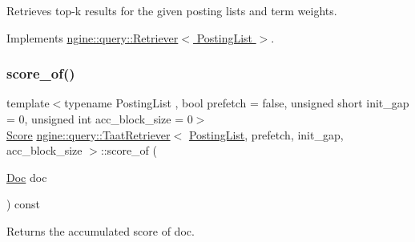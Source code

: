 Retrieves top-\/k results for the given posting lists and term weights. 



Implements \hyperlink{classngine_1_1query_1_1Retriever_ac5549667cbb5927ec4ead8b9ec8aece0}{ngine\+::query\+::\+Retriever$<$ Posting\+List $>$}.

\mbox{\label{classngine_1_1query_1_1TaatRetriever_abebbcb23c11cbc5cc3628d8c5234e94b}} 
\subsubsection{\texorpdfstring{score\+\_\+of()}{score\_of()}}
{\footnotesize\ttfamily template$<$typename Posting\+List , bool prefetch = false, unsigned short init\+\_\+gap = 0, unsigned int acc\+\_\+block\+\_\+size = 0$>$ \\
\hyperlink{structngine_1_1Score}{Score} \hyperlink{classngine_1_1query_1_1TaatRetriever}{ngine\+::query\+::\+Taat\+Retriever}$<$ \hyperlink{classngine_1_1PostingList}{Posting\+List}, prefetch, init\+\_\+gap, acc\+\_\+block\+\_\+size $>$\+::score\+\_\+of (\begin{DoxyParamCaption}\item[{\hyperlink{structngine_1_1Doc}{Doc}}]{doc }\end{DoxyParamCaption}) const\hspace{0.3cm}{\ttfamily [inline]}}



Returns the accumulated score of doc. 

\mbox{\label{classngine_1_1query_1_1TaatRetriever_a0eab909f9d3ac3d9f09752a581e8bf54}} 
